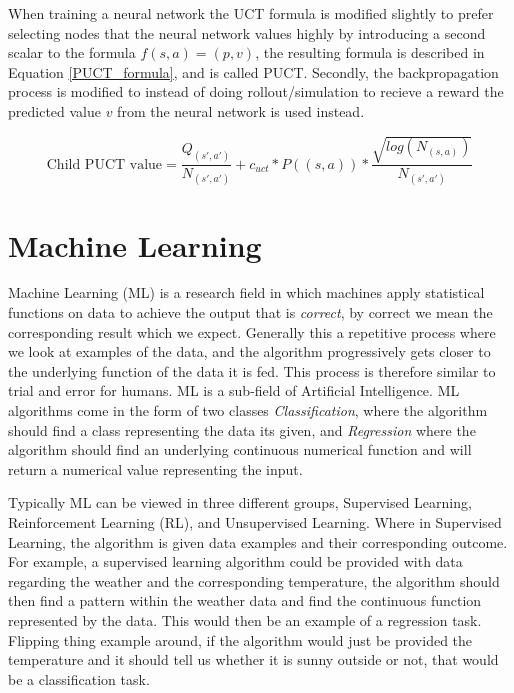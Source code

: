 When training a neural network the UCT formula is modified slightly to prefer selecting nodes
that the neural network values highly by introducing a second scalar to the formula $f(s,a) = (p,v)$,
the resulting formula is described in Equation \ref{PUCT_formula}, and is called PUCT. Secondly, the backpropagation process
is modified to instead of doing rollout/simulation to recieve a reward the predicted value $v$ from
the neural network is used instead.

\begin{equation} \label{PUCT_formula}
  \text{Child PUCT value} = \frac{Q_{(s',a')}}{N_{(s',a')}} + c_{uct} * P((s,a)) * \frac{\sqrt{log(N_{(s,a)})}}{N_{(s',a')}}
\end{equation}

\section{Machine Learning}

Machine Learning (ML) is a research field in which machines apply statistical functions on data to achieve the output that is \textit{correct}, by correct we mean the corresponding result which we expect. Generally this a repetitive process where we look at examples of the data, and the algorithm progressively gets closer to the underlying function of the data it is fed. This process is therefore similar to trial and error for humans. ML is a sub-field of Artificial Intelligence. ML algorithms come in the form of two classes \textit{Classification}, where the algorithm should find a class representing the data its given, and \textit{Regression} where the algorithm should find an underlying continuous numerical function and will return a numerical value representing the input. 

Typically ML can be viewed in three different groups, Supervised Learning, Reinforcement Learning (RL), and Unsupervised Learning. Where in Supervised Learning, the algorithm is given data examples and their corresponding outcome. For example, a supervised learning algorithm could be provided with data regarding the weather and the corresponding temperature, the algorithm should then find a pattern within the weather data and find the continuous function represented by the data. This would then be an example of a regression task. Flipping thing example around, if the algorithm would just be provided the temperature and it should tell us whether it is sunny outside or not, that would be a classification task.


